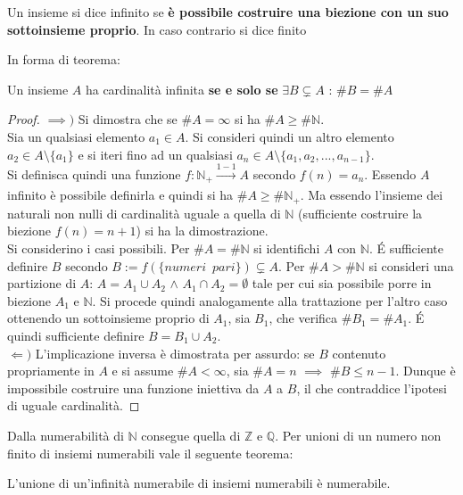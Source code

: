 \documentclass[10pt, oneside]{book}
\theoremstyle{plain}
\begin{document}
\begin{defin}
    Un insieme si dice infinito se \textbf{è possibile costruire una biezione con un suo sottoinsieme proprio}. In caso contrario si dice finito
\end{defin}
In forma di teorema:
\begin{ther}
    Un insieme $A$ ha cardinalità infinita \textbf{se e solo se} $\exists B \subsetneq A$ : $\#B = \#A$
\end{ther}
\begin{proof}
    $\mathbf{\implies)}$ Si dimostra che se $\#A = \infty$ si ha $\#A \geq \#\mathbb{N}$. 
    \\Sia un qualsiasi elemento $a_1 \in A$. Si consideri quindi un altro elemento $a_2 \in A \setminus \{a_1\}$ e si iteri fino ad un qualsiasi $a_n \in A \setminus \{a_1, a_2, ..., a_{n-1}\}$.
    \\Si definisca quindi una funzione $f: \mathbb{N}_+ \xrightarrow[]{1-1} A$ secondo $f(n) = a_n$. Essendo $A$ infinito è possibile definirla e quindi si ha $\#A \geq \#\mathbb{N}_+$. Ma essendo l'insieme dei naturali non nulli di cardinalità uguale a quella di $\mathbb{N}$ (sufficiente costruire la biezione $f(n) = n+1$) si ha la dimostrazione.
    \\Si considerino i casi possibili. Per $\#A = \#\mathbb{N}$ si identifichi $A$ con $\mathbb{N}$. \'E sufficiente definire $B$ secondo $B := f(\{numeri \enspace pari\}) \subsetneq A$. Per $\#A > \#\mathbb{N}$ si consideri una partizione di $A$: $A = A_1 \cup A_2$ $\land$ $A_1 \cap A_2 = \emptyset$ tale per cui sia possibile porre in biezione $A_1$ e $\mathbb{N}$. Si procede quindi analogamente alla trattazione per l'altro caso ottenendo un sottoinsieme proprio di $A_1$, sia $B_1$, che verifica $\#B_1 = \#A_1$. \'E quindi sufficiente definire $B = B_1 \cup A_2$.
    \\$\mathbf{\Leftarrow)}$ L'implicazione inversa è dimostrata per assurdo: se $B$ contenuto propriamente in $A$ e si assume $\#A < \infty$, sia $\#A = n$ $\implies$ $\#B \leq n-1$. Dunque è impossibile costruire una funzione iniettiva da $A$ a $B$, il che contraddice l'ipotesi di uguale cardinalità.
\end{proof}
Dalla numerabilità di $\mathbb{N}$ consegue quella di $\mathbb{Z}$ e $\mathbb{Q}$. Per unioni di un numero non finito di insiemi numerabili vale il seguente teorema:
\begin{ther}
    L'unione di un'infinità numerabile di insiemi numerabili è numerabile.
\end{ther}
\end{document}
